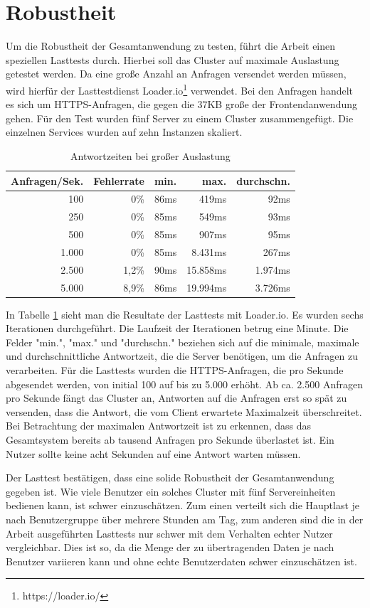 \section{Robustheit}
\label{sec:robustheit}
Um die Robustheit der Gesamtanwendung zu testen, führt die Arbeit
einen speziellen Lasttests durch. Hierbei soll das Cluster auf maximale
Auslastung getestet werden. Da eine große Anzahl an Anfragen versendet werden müssen,
wird hierfür der Lasttestdienst Loader.io\footnote{https://loader.io/} verwendet.
Bei den Anfragen handelt es sich um HTTPS-Anfragen, die gegen
die 37KB große  der Frontendanwendung gehen. Für den Test
wurden fünf Server zu einem Cluster zusammengefügt. Die einzelnen Services wurden
auf zehn Instanzen skaliert.

\begin{table}[h]
\begin{center}
\begin{tabular}{rrrrr}
Anfragen/Sek. & Fehlerrate & min. & max. & durchschn. \\
\hline
100 &  0\% & 86ms & 419ms & 92ms \\
250 &  0\% & 85ms & 549ms & 93ms \\
500 &  0\% & 85ms & 907ms & 95ms \\
1.000 &  0\% & 85ms & 8.431ms & 267ms \\
2.500 &  1,2\% & 90ms & 15.858ms & 1.974ms \\
5.000 &  8,9\% & 86ms & 19.994ms & 3.726ms \\
\end{tabular}
\end{center}
\caption{Antwortzeiten bei großer Auslastung}
\label{tab:resultatdeslasttestsmitloaderio}
\end{table}

In Tabelle \ref{tab:resultatdeslasttestsmitloaderio} sieht man die Resultate
der Lasttests mit Loader.io. Es wurden sechs Iterationen durchgeführt. Die Laufzeit der
Iterationen betrug eine Minute. Die Felder "min.", "max." und "durchschn." beziehen
sich auf die minimale, maximale und durchschnittliche
Antwortzeit, die die Server benötigen, um die
Anfragen zu verarbeiten. Für die Lasttests wurden die HTTPS-Anfragen,
die pro Sekunde abgesendet werden, von initial 100 auf bis zu 5.000 erhöht.
Ab ca. 2.500 Anfragen pro Sekunde fängt das Cluster an, Antworten auf die
Anfragen erst so spät zu versenden, dass die Antwort, die vom Client
erwartete Maximalzeit überschreitet. Bei Betrachtung der maximalen Antwortzeit ist zu
erkennen, dass das Gesamtsystem bereits ab tausend Anfragen pro Sekunde
überlastet ist. Ein Nutzer sollte keine acht Sekunden auf eine Antwort warten
müssen.

Der Lasttest bestätigen, dass eine solide Robustheit der Gesamtanwendung gegeben ist.
Wie viele Benutzer ein solches Cluster mit fünf Servereinheiten
bedienen kann, ist schwer einzuschätzen. Zum einen verteilt sich die Hauptlast je nach
Benutzergruppe über mehrere Stunden am Tag, zum anderen sind die in der Arbeit ausgeführten
Lasttests nur schwer mit dem Verhalten echter Nutzer vergleichbar. Dies ist so,
da die Menge der zu übertragenden Daten je nach Benutzer variieren kann
und ohne echte Benutzerdaten schwer einzuschätzen ist.
